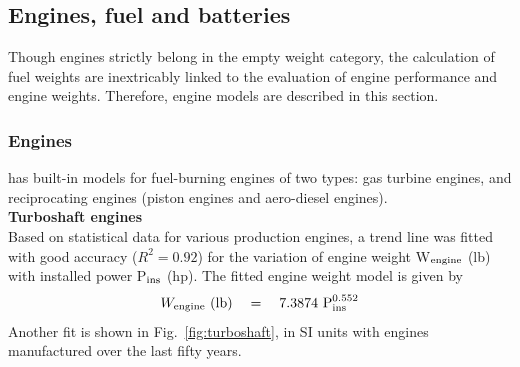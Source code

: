 \subsection{Engines, fuel and batteries}
Though engines strictly belong in the empty weight category, the calculation of fuel weights are inextricably linked to the evaluation of engine performance and engine weights. Therefore, engine models are described in this section. 

\subsubsection{Engines}
\hydra \spc has built-in models for fuel-burning engines of two types: gas turbine engines, and reciprocating engines (piston engines and aero-diesel engines). \\
\textbf{Turboshaft engines} \\
Based on statistical data for various production engines, a trend line was fitted with good accuracy ($R^2 = 0.92$) for the variation of engine weight W$_{\rm engine}$ (lb) with installed power P$_{\rm ins}$ (hp). The fitted engine weight model is given by
\begin{equation}
\label{eqn:turbowt}
W_{\rm engine}\textrm{ } (\textrm{lb}) \quad = \quad 7.3874 \textrm{ P}_{\rm ins}^{0.552}
\end{equation}
Another fit is shown in Fig.~\ref{fig:turboshaft}, in SI units with engines manufactured over the last fifty years.

